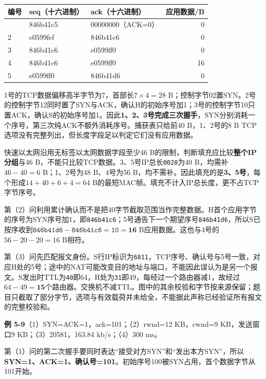 \documentclass{sidenotes-simplex}
\begin{document}
\begin{longtable}[]{@{}lllr@{}}
\toprule\noalign{}
编号 & seq（十六进制） & ack（十六进制） & 应用数据/B \\
\midrule\noalign{}
\endhead
\bottomrule\noalign{}
\endlastfoot
1 & 846b41c5 & 00000000（ACK=0） & 0 \\
2 & e0599fef & 846b41c6 & 0 \\
3 & 846b41c6 & e0599ff0 & 0 \\
4 & 846b41c6 & e0599ff0 & 16 \\
5 & e0599ff0 & 846b41d6 & 0 \\
\end{longtable}

1号的TCP数据偏移高半字节为7，首部长\(7\times4=28\) B；控制字节02置SYN。2号的控制字节12同时置了SYN与ACK，确认H的初始序号加1；3号的控制字节10只置ACK，确认S的初始序号加1。因此\textbf{1、2、3号完成三次握手}，SYN分别消耗一个序号，第三次纯ACK不额外消耗序号。捕获表只给前40 B，1、2号的8 B TCP选项没有完整列出，但长度字段足以判定它们没有应用数据。

快速以太网沿用无标签以太网数据字段至少46 B的限制，判断填充应比较\textbf{整个IP分组}与46 B，不能只比较TCP数据。3、5号IP总长\texttt{0028}为40 B，均需补\(46-40=6\) B；1、2号为48 B、4号为56 B，均不需补。因此填充的是\textbf{3、5号}，每个形成\(14+40+6+4=64\) B的最短MAC帧。填充不计入IP总长度，更不占TCP字节序号。

第（2）问利用累计确认而不是把40字节截取范围当作完整数据。H首个应用字节的序号为SYN序号加1，即\texttt{846b41c6}；5号通告下一个期望序号\texttt{846b41d6}，所以S已按序收到\(\mathtt{846b41d6}-\mathtt{846b41c6}=\mathtt{10}=\mathbf{16}\) B应用数据。这也与4号的\(56-20-20=16\) B相符。

第（3）问先匹配报文身份。S行IP标识为\texttt{6811}，TCP序号、确认号与5号一致，对应H处的5号；途中的NAT可能改变目的地址与端口，不能因此误认为是另一个报文。S发出时TTL为\texttt{40}即64，H处为\texttt{31}即49，每经过一个路由器减1，故经过\(64-49=\mathbf{15}\)个路由器。交换机不减TTL。图中的其余校验和字节按来源保留；题目只截取了部分字节，选项与有效载荷并未给全，不能据此声称已经验证所有报文的完整校验和。

\par\medskip\Needspace{30.00mm}\noindent{}\label{a:CN05-E09}\textbf{例 5-9}\quad （1）SYN=ACK=1，ack=101；（2）rwnd=12 KB，cwnd=9 KB，发送窗口9 KB；（3）20581，163.84 kb/s；（4）300 ms。
\par\smallskip
第（1）问的第二次握手要同时表达``接受对方SYN''和``发出本方SYN''，所以\textbf{SYN=1、ACK=1、确认号=101}。初始序号100被SYN占用，首个数据字节从101开始。
\end{document}
